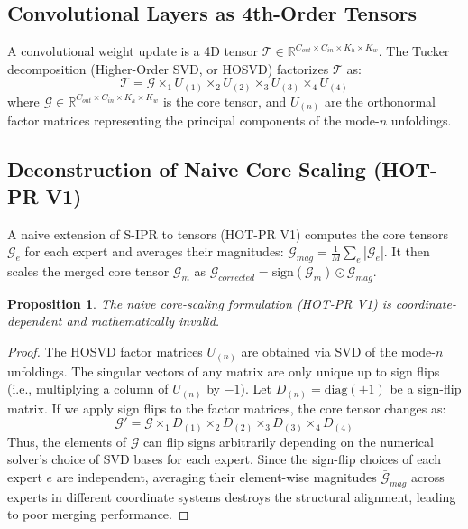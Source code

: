 \documentclass{article}
\theoremstyle{plain}
\newtheorem{proposition}[theorem]{Proposition}
\theoremstyle{definition}
\theoremstyle{remark}
\begin{document}
\subsection{Convolutional Layers as 4th-Order Tensors}
A convolutional weight update is a 4D tensor $\mathcal{T} \in \mathbb{R}^{C_{out} \times C_{in} \times K_h \times K_w}$. The Tucker decomposition (Higher-Order SVD, or HOSVD) factorizes $\mathcal{T}$ as:
\begin{equation}
    \mathcal{T} = \mathcal{G} \times_1 U_{(1)} \times_2 U_{(2)} \times_3 U_{(3)} \times_4 U_{(4)}
\end{equation}
where $\mathcal{G} \in \mathbb{R}^{C_{out} \times C_{in} \times K_h \times K_w}$ is the core tensor, and $U_{(n)}$ are the orthonormal factor matrices representing the principal components of the mode-$n$ unfoldings.

\subsection{Deconstruction of Naive Core Scaling (HOT-PR V1)}
A naive extension of S-IPR to tensors (HOT-PR V1) computes the core tensors $\mathcal{G}_e$ for each expert and averages their magnitudes: $\bar{\mathcal{G}}_{mag} = \frac{1}{M}\sum_e |\mathcal{G}_e|$. It then scales the merged core tensor $\mathcal{G}_m$ as $\mathcal{G}_{corrected} = \text{sign}(\mathcal{G}_m) \odot \bar{\mathcal{G}}_{mag}$.

\begin{proposition}
The naive core-scaling formulation (HOT-PR V1) is coordinate-dependent and mathematically invalid.
\end{proposition}
\begin{proof}
The HOSVD factor matrices $U_{(n)}$ are obtained via SVD of the mode-$n$ unfoldings. The singular vectors of any matrix are only unique up to sign flips (i.e., multiplying a column of $U_{(n)}$ by $-1$). Let $D_{(n)} = \text{diag}(\pm 1)$ be a sign-flip matrix. If we apply sign flips to the factor matrices, the core tensor changes as:
\begin{equation}
    \mathcal{G}' = \mathcal{G} \times_1 D_{(1)} \times_2 D_{(2)} \times_3 D_{(3)} \times_4 D_{(4)}
\end{equation}
Thus, the elements of $\mathcal{G}$ can flip signs arbitrarily depending on the numerical solver's choice of SVD bases for each expert. Since the sign-flip choices of each expert $e$ are independent, averaging their element-wise magnitudes $\bar{\mathcal{G}}_{mag}$ across experts in different coordinate systems destroys the structural alignment, leading to poor merging performance.
\end{proof}
\end{document}

